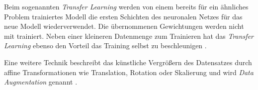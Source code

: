 Beim sogenannten \textit{Transfer Learning} werden von einem bereits für ein ähnliches Problem trainiertes Modell die ersten Schichten des neuronalen Netzes für das neue Modell wiederverwendet. Die übernommenen Gewichtungen werden nicht mit trainiert. Neben einer kleineren Datenmenge zum Trainieren hat das \textit{Transfer Learning} ebenso den Vorteil das Training selbst zu beschleunigen \cite{AurelienGeron.2018}.

Eine weitere Technik beschreibt das künstliche Vergrößern des Datensatzes durch affine Transformationen wie Translation, Rotation oder Skalierung und wird \textit{Data Augmentation} genannt \cite{AurelienGeron.2018}.
